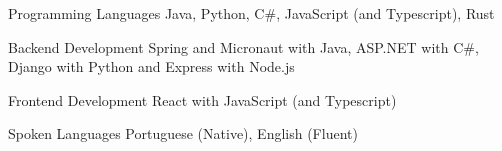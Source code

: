 


\begin{cvskills}


  \cvskill
  {Programming Languages} %
  {Java, Python, C\#, JavaScript (and Typescript), Rust} %


  \cvskill
  {Backend Development} %
  {Spring and Micronaut with Java, ASP.NET with C\#, Django with Python and Express with Node.js} %


  \cvskill
  {Frontend Development} %
  {React with JavaScript (and Typescript)} %


  \cvskill
  {Spoken Languages} %
  {Portuguese (Native), English (Fluent)} %


\end{cvskills}

